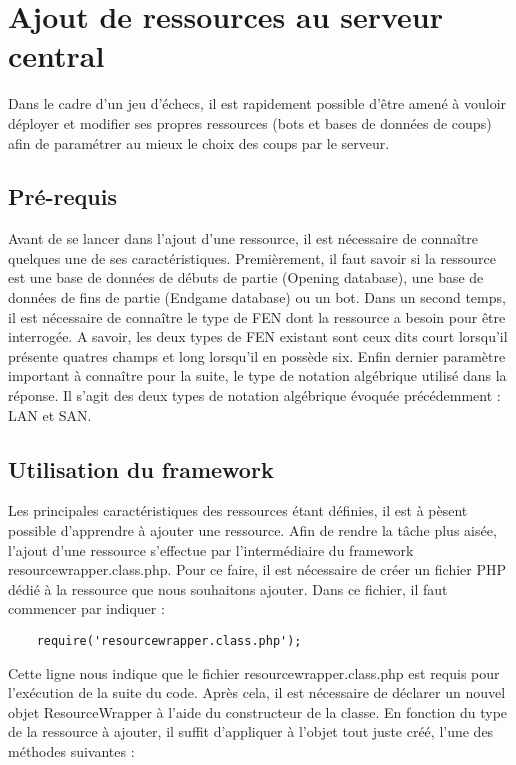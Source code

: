 \documentclass[a4paper,11pt]{article}
\begin{document}
\section{Ajout de ressources au serveur central}
Dans le cadre d'un jeu d'échecs, il est rapidement possible d'être amené à vouloir déployer et modifier ses propres ressources (bots et bases de données de coups) afin de paramétrer au mieux le choix des coups par le serveur.
        

\subsection{Pré-requis}
Avant de se lancer dans l'ajout d'une ressource, il est nécessaire de connaître quelques une de ses caractéristiques.
Premièrement, il faut savoir si la ressource est une base de données de débuts de partie (Opening database), une base de données de fins de partie (Endgame database) ou un bot.
Dans un second temps, il est nécessaire de connaître le type de FEN dont la ressource a besoin pour être interrogée.
A savoir, les deux types de FEN existant sont ceux dits court lorsqu'il présente quatres champs et long lorsqu'il en possède six.
Enfin dernier paramètre important à connaître pour la suite, le type de notation algébrique utilisé dans la réponse.
Il s'agit des deux types de notation algébrique évoquée précédemment : LAN et SAN.
	
     
\subsection{Utilisation du framework}
Les principales caractéristiques des ressources étant définies, il est à pèsent possible d'apprendre à ajouter une ressource.
Afin de rendre la tâche plus aisée, l'ajout d'une ressource s'effectue par l'intermédiaire du framework resourcewrapper.class.php.
Pour ce faire, il est nécessaire de créer un fichier PHP dédié à la ressource que nous souhaitons ajouter.
Dans ce fichier, il faut commencer par indiquer : 
	\begin{lstlisting}
	require('resourcewrapper.class.php');
	\end{lstlisting} 
	Cette ligne nous indique que le fichier resourcewrapper.class.php est requis pour l'exécution de la suite du code. Après cela, il est nécessaire de déclarer un nouvel objet ResourceWrapper à l'aide du constructeur de la classe. En fonction du type de la ressource à ajouter, il suffit d'appliquer à l'objet tout juste créé, l'une des méthodes suivantes :
\end{document}
